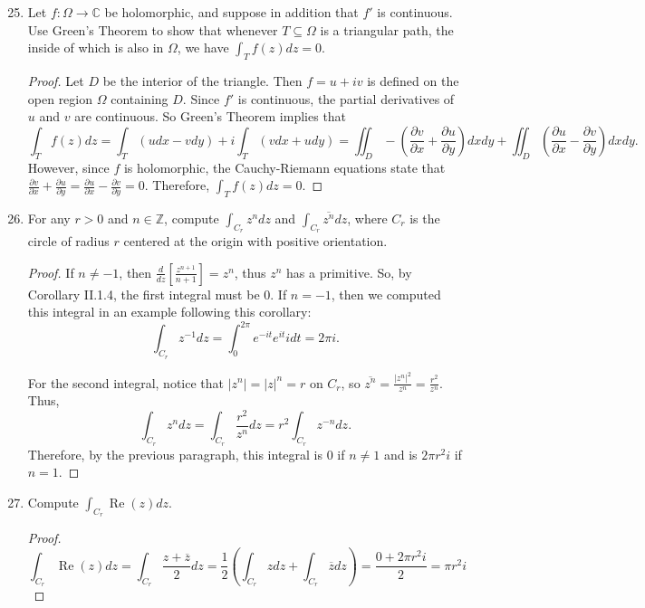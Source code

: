 \documentclass[10pt]{article}
\newcommand{\Z}{\mathbb{Z}}
\newcommand{\C}{\mathbb{C}}
\DeclareMathOperator*{\re}{Re}
\renewcommand{\bar}{\overline}
\begin{document}
\begin{enumerate}
\setcounter{enumi}{24}
\item Let $f: \Omega \rightarrow \C$ be holomorphic, and suppose in addition that $f'$ is continuous.  Use Green's Theorem to show that whenever $T \subseteq \Omega$ is a triangular path, the inside of which is also in $\Omega$, we have $\int_T f(z)dz = 0$.

\begin{proof}
Let $D$ be the interior of the triangle.  Then $f = u+iv$ is defined on the open region $\Omega$ containing $D$.  Since $f'$ is continuous, the partial derivatives of $u$ and $v$ are continuous.  So Green's Theorem implies that
$$
\int_T f(z)dz = \int_T (u dx - v dy) + i \int_T (vdx + udy) = \iint_{D} - \left( \frac{\partial v}{\partial x} + \frac{\partial u}{\partial y} \right) dxdy + \iint_{D} \left( \frac{\partial u}{\partial x} - \frac{\partial v}{\partial y} \right) dxdy.
$$
However, since $f$ is holomorphic, the Cauchy-Riemann equations state that $\frac{\partial v}{\partial x} + \frac{\partial u}{\partial y} = \frac{\partial u}{\partial x} - \frac{\partial v}{\partial y} = 0$.  Therefore, $\int_T f(z)dz = 0$.
\end{proof}

\item For any $r > 0$ and $n \in \Z$, compute $\int_{C_r} z^n dz$ and $\int_{C_r} \bar{z^n} dz$, where $C_r$ is the circle of radius $r$ centered at the origin with positive orientation.
\begin{proof}

If $n \neq -1$, then $\frac{d}{dz}[ \frac{z^{n+1}}{n+1}] = z^n$, thus $z^n$ has a primitive.  So, by Corollary II.1.4, the first integral must be 0.  If $n=-1$, then we computed this integral in an example following this corollary:
$$
\int_{C_r} z^{-1} dz = \int_0^{2\pi} e^{-it}e^{it} i dt = 2\pi i.
$$

For the second integral, notice that $|z^n| = |z|^n = r$ on $C_r$, so $\bar{z^n} = \frac{|z^n|^2}{z^n} = \frac{r^2}{z^n}$.  Thus,
$$
\int_{C_r} z^n dz = \int_{C_r} \frac{r^2}{z^n} dz = r^2 \int_{C_r} z^{-n} dz.
$$
Therefore, by the previous paragraph, this integral is $0$ if $n \neq 1$ and is $2\pi r^2i$ if $n = 1$.
\end{proof}

\item Compute $\int_{C_r} \re (z) dz$.
\begin{proof}
$$
\int_{C_r} \re(z)dz = \int_{C_r} \frac{z + \bar{z}}{2}dz = \frac12 \left( \int_{C_r}zdz + \int_{C_r} \bar{z}dz \right) = \frac{0 + 2\pi r^2 i}{2} = \pi r^2i
$$
\end{proof}


\end{enumerate}
\end{document}
